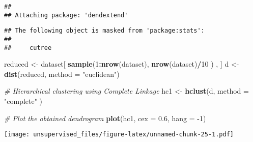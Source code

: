 \documentclass[
]{article}
\newenvironment{Shaded}{\begin{snugshade}}{\end{snugshade}}
\newcommand{\CommentTok}[1]{\textcolor[rgb]{0.56,0.35,0.01}{\textit{#1}}}
\newcommand{\ControlFlowTok}[1]{\textcolor[rgb]{0.13,0.29,0.53}{\textbf{#1}}}
\newcommand{\DataTypeTok}[1]{\textcolor[rgb]{0.13,0.29,0.53}{#1}}
\newcommand{\DecValTok}[1]{\textcolor[rgb]{0.00,0.00,0.81}{#1}}
\newcommand{\FloatTok}[1]{\textcolor[rgb]{0.00,0.00,0.81}{#1}}
\newcommand{\KeywordTok}[1]{\textcolor[rgb]{0.13,0.29,0.53}{\textbf{#1}}}
\newcommand{\NormalTok}[1]{#1}
\newcommand{\OperatorTok}[1]{\textcolor[rgb]{0.81,0.36,0.00}{\textbf{#1}}}
\newcommand{\StringTok}[1]{\textcolor[rgb]{0.31,0.60,0.02}{#1}}
\begin{document}
\begin{verbatim}
## 
## Attaching package: 'dendextend'
\end{verbatim}

\begin{verbatim}
## The following object is masked from 'package:stats':
## 
##     cutree
\end{verbatim}

\begin{Shaded}
\begin{Highlighting}[]
\NormalTok{reduced <-}\StringTok{ }\NormalTok{dataset[ }\KeywordTok{sample}\NormalTok{(}\DecValTok{1}\OperatorTok{:}\KeywordTok{nrow}\NormalTok{(dataset), }\KeywordTok{nrow}\NormalTok{(dataset)}\OperatorTok{/}\DecValTok{10}\NormalTok{ ) , ]}
\NormalTok{d <-}\StringTok{ }\KeywordTok{dist}\NormalTok{(reduced, }\DataTypeTok{method =} \StringTok{"euclidean"}\NormalTok{)}


\CommentTok{# Hierarchical clustering using Complete Linkage}
\NormalTok{hc1 <-}\StringTok{ }\KeywordTok{hclust}\NormalTok{(d, }\DataTypeTok{method =} \StringTok{"complete"}\NormalTok{ )}

\CommentTok{# Plot the obtained dendrogram}
\KeywordTok{plot}\NormalTok{(hc1, }\DataTypeTok{cex =} \FloatTok{0.6}\NormalTok{, }\DataTypeTok{hang =} \DecValTok{-1}\NormalTok{)}
\end{Highlighting}
\end{Shaded}

\texttt{[image: unsupervised\_files/figure-latex/unnamed-chunk-25-1.pdf]}

\begin{Shaded}
\end{Shaded}
\end{document}
